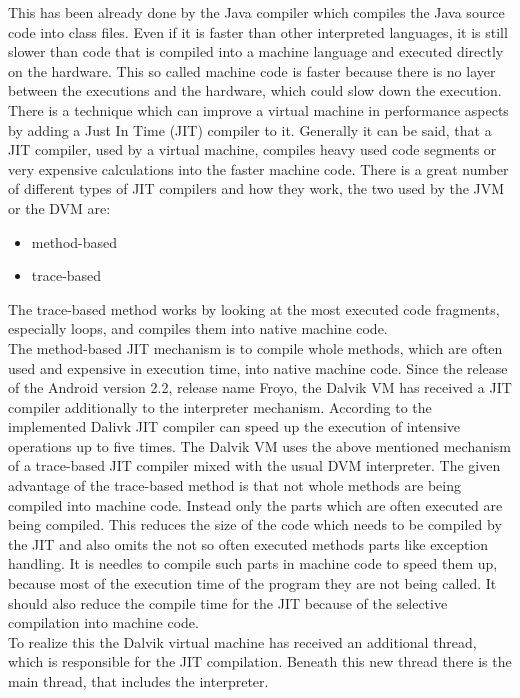 This has been already done by the Java compiler which compiles the Java source code into class files.
Even if it is faster than other interpreted languages, it is still slower than code that is compiled into a machine language and executed directly on the hardware.
This so called machine code is faster because there is no layer between the executions and the hardware, which could slow down the execution.~\cite{aycock2003brief}\\
There is a technique which can improve a virtual machine in performance aspects by adding a Just In Time (JIT) compiler to it.
Generally it can be said, that a JIT compiler, used by a virtual machine, compiles heavy used code segments or very expensive calculations into the faster machine code.
There is a great number of different types of JIT compilers and how they work, the two used by the JVM or the DVM are:
\begin{itemize}
\item method-based
\item trace-based
\end{itemize}
The trace-based method works by looking at the most executed code fragments, especially loops, and compiles them into native machine code.\\
The method-based JIT mechanism is to compile whole methods, which are often used and expensive in execution time, into native machine code.
Since the release of the Android version 2.2, release name Froyo, the Dalvik VM has received a JIT compiler additionally to the interpreter mechanism.
According to \cite{cheng2010jit} the implemented Dalivk JIT compiler can speed up the execution of intensive operations up to five times.
The Dalvik VM uses the above mentioned mechanism of a trace-based JIT compiler mixed with the usual DVM interpreter.
The given advantage of the trace-based method is that not whole methods are being compiled into machine code.
Instead only the parts which are often executed are being compiled.
This reduces the size of the code which needs to be compiled by the JIT and also omits the not so often executed methods parts like exception handling.
It is needles to compile such parts in machine code to speed them up, because most of the execution time of the program they are not being called.
It should also reduce the compile time for the JIT because of the selective compilation into machine code.\\
To realize this the Dalvik virtual machine has received an additional thread, which is responsible for the JIT compilation.
Beneath this new thread there is the main thread, that includes the interpreter.
